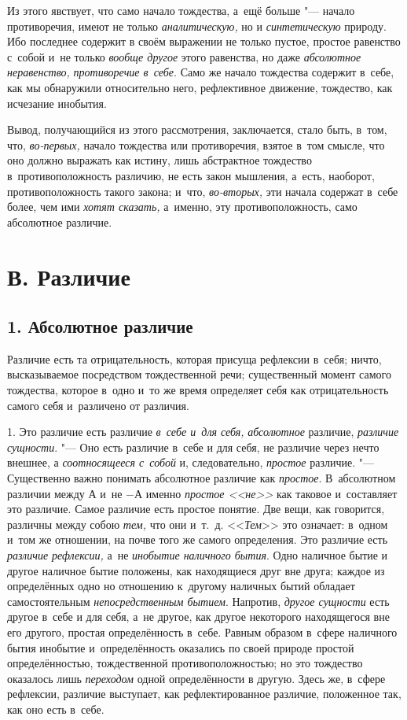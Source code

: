 Из этого явствует, что само начало тождества, а~ещё больше "--- начало
противоречия, имеют не только {\em аналитическую,} но и
{\em синтетическую} природу. Ибо последнее содержит в
своём выражении не только пустое, простое равенство с~собой и~не только
{\em вообще другое} этого равенства, но даже
{\em абсолютное неравенство,}
{\em противоречие в~себе}. Само же начало тождества
содержит в~себе, как мы обнаружили относительно него, рефлективное
движение, тождество, как исчезание инобытия.

Вывод, получающийся из этого рассмотрения, заключается, стало быть, в~том,
что, {\em во-первых,} начало тождества или
противоречия, взятое в~том смысле, что оно должно выражать как истину, лишь
абстрактное тождество в~противоположность различию, не есть закон мышления,
а~есть, наоборот, противоположность такого закона; и~что,
{\em во-вторых,} эти начала содержат в~себе более, чем
ими {\em хотят сказать,} а~именно, эту
противоположность, само абсолютное различие.

\section[В. Различие]{В. Различие}
\subsection[1. Абсолютное различие]{1. Абсолютное различие}
Различие есть та отрицательность, которая
присуща рефлексии в~себя; ничто, высказываемое посредством тождественной
речи; существенный момент самого тождества, которое в~одно и~то же время
определяет себя как отрицательность самого себя и~различено от различия.

1. Это различие есть различие {\em в~себе и~для себя,}
{\em абсолютное} различие,
{\em различие сущности}. "--- Оно есть различие в~себе и
для себя, не различие через нечто внешнее, а
{\em соотносящееся с~собой} и, следовательно,
{\em простое} различие. "--- Существенно важно понимать
абсолютное различие как {\em простое}. В~абсолютном
различии между $А$ и~не $-А$ именно
{\em простое <<не>>} как таковое и~составляет это
различие. Самое различие есть простое понятие. Две вещи, как говорится,
различны между собою {\em тем,} что они и~т.~д.
<<{\em Тем}>> это означает: в~одном и~том же отношении,
на почве того же самого определения. Это различие есть
{\em различие рефлексии,} а~не
{\em инобытие наличного бытия}. Одно наличное бытие и
другое наличное бытие положены, как находящиеся друг вне друга; каждое из
определённых одно но отношению к~другому наличных бытий обладает
самостоятельным {\em непосредственным бытием}.
Напротив, {\em другое сущности} есть другое в~себе и
для себя, а~не другое, как другое некоторого находящегося вне его другого,
простая определённость в~себе. Равным образом в~сфере наличного бытия
инобытие и~определённость оказались по своей природе простой
определённостью, тождественной противоположностью; но это тождество
оказалось лишь {\em переходом} одной определённости в
другую. Здесь же, в~сфере рефлексии, различие выступает, как
рефлектированное различие, положенное так, как оно есть в~себе.

